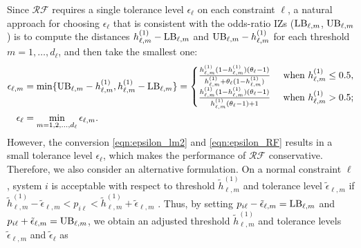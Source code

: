 \documentclass[11pt]{article}
\begin{document}
Since $\mathcal{RF}$ requires a single tolerance level $\epsilon_\ell$ on each constraint $\ell$, a natural approach for choosing $\epsilon_\ell$ that is consistent with the odds-ratio IZs (${\rm LB}_{\ell,m}$, ${\rm UB}_{\ell,m}$) is to compute the distances $h_{\ell,m}^{(1)}-{\rm LB}_{\ell,m}$ and ${\rm UB}_{\ell,m}-h_{\ell,m}^{(1)}$ for each threshold $m=1,\ldots,d_\ell$, and then take the smallest one:
\begin{align}
    \epsilon_{\ell,m}&=\min\{ {\rm UB}_{\ell,m}-h_{\ell,m}^{(1)}, h_{\ell,m}^{(1)}-{\rm LB}_{\ell,m}\} %
        = \begin{cases}
            \frac{h_{\ell,m}^{(1)} (1-h_{\ell,m}^{(1)})(\theta_\ell-1)}{h_{\ell,m}^{(1)}+\theta_\ell (1-h_{\ell,m}^{(1)})} & \text{ when } h_{\ell,m}^{(1)}\leq 0.5,   \\
            \frac{h_{\ell,m}^{(1)} (1-h_{\ell,m}^{(1)}) (\theta_\ell-1)}{h_{\ell,m}^{(1)} (\theta_\ell-1)+1} & \text{ when } h_{\ell,m}^{(1)}>0.5;
        \end{cases}  
        \label{eqn:epsilon_lm2}  \\
        \epsilon_\ell &= \min_{m=1,2,\ldots, d_\ell} \epsilon_{\ell,m}.
        \label{eqn:epsilon_RF}
\end{align} 
However, the conversion \eqref{eqn:epsilon_lm2} and \eqref{eqn:epsilon_RF} results in a small tolerance level $\epsilon_\ell$, which makes the performance of $\mathcal{RF}$ conservative. 
Therefore, we also consider an alternative formulation. On a normal constraint $\ell$, system $i$ is acceptable with respect to threshold $\tilde{h}_{\ell,m}^{(1)}$ and tolerance level $\tilde{\epsilon}_{\ell,m}$ if   $\tilde{h}_{\ell,m}^{(1)}-\tilde{\epsilon}_{\ell,m}< p_{i\ell} < \tilde{h}_{\ell,m}^{(1)}+\tilde{\epsilon}_{\ell,m}$ \citep{zhou2022finding}. Thus, by setting $p_{i\ell}-\tilde{\epsilon}_{\ell,m}={\rm LB}_{\ell,m}$ and $p_{i\ell}+\tilde{\epsilon}_{\ell,m}={\rm UB}_{\ell,m}$, we obtain an adjusted threshold $\tilde{h}_{\ell,m}^{(1)}$ and tolerance levels $\tilde{\epsilon}_{\ell,m}$ and $\tilde{\epsilon}_\ell$ as 
\end{document}

